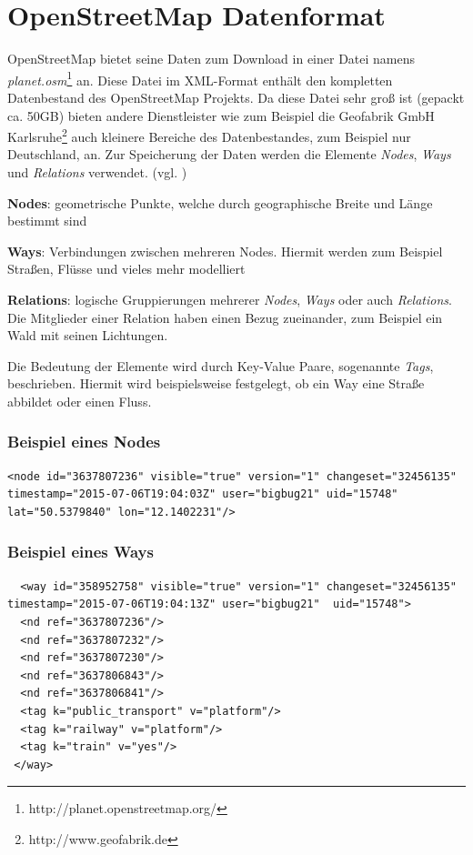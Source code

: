 \section{OpenStreetMap Datenformat}
\label{sec:appendix:osm:data}
OpenStreetMap bietet seine Daten zum Download in einer Datei namens \textit{planet.osm}\footnote{http://planet.openstreetmap.org/} an. Diese Datei im XML-Format enthält den kompletten Datenbestand des OpenStreetMap Projekts. 
Da diese Datei sehr groß ist (gepackt ca. 50GB) bieten andere Dienstleister wie zum Beispiel die Geofabrik GmbH Karlsruhe\footnote{http://www.geofabrik.de} auch kleinere Bereiche des Datenbestandes, zum Beispiel nur Deutschland, an.
Zur Speicherung der Daten werden die Elemente \textit{Nodes}, \textit{Ways} und \textit{Relations} verwendet. (vgl. \cite{WEB:OSM:Primitives:2015})
\begin{compactitem}
  \item \textbf{Nodes}: geometrische Punkte, welche durch geographische Breite und Länge bestimmt sind
  \item \textbf{Ways}: Verbindungen zwischen mehreren Nodes. Hiermit werden zum Beispiel Straßen, Flüsse und vieles mehr modelliert
  \item \textbf{Relations}: logische Gruppierungen mehrerer \textit{Nodes}, \textit{Ways} oder auch \textit{Relations}. Die Mitglieder einer Relation haben einen Bezug zueinander, zum Beispiel ein Wald mit seinen Lichtungen. 
\end{compactitem}
Die Bedeutung der Elemente wird durch Key-Value Paare, sogenannte \textit{Tags}, beschrieben.
Hiermit wird beispielsweise festgelegt, ob ein Way eine Straße abbildet oder einen Fluss.

\subsubsection{Beispiel eines Nodes}

\lstset{
  numbers=none,
  caption=Beispiel eines Nodes aus planet.osm,
  label=
}
\begin{lstlisting}
<node id="3637807236" visible="true" version="1" changeset="32456135" timestamp="2015-07-06T19:04:03Z" user="bigbug21" uid="15748" lat="50.5379840" lon="12.1402231"/>
\end{lstlisting}

\subsubsection{Beispiel eines Ways}
\lstset{
  numbers=none,
  caption=Beispiel eines Ways aus planet.osm,
  label=
}
\begin{lstlisting}
  <way id="358952758" visible="true" version="1" changeset="32456135" timestamp="2015-07-06T19:04:13Z" user="bigbug21"  uid="15748">
  <nd ref="3637807236"/>
  <nd ref="3637807232"/>
  <nd ref="3637807230"/>
  <nd ref="3637806843"/>
  <nd ref="3637806841"/>
  <tag k="public_transport" v="platform"/>
  <tag k="railway" v="platform"/>
  <tag k="train" v="yes"/>
 </way>
\end{lstlisting}

